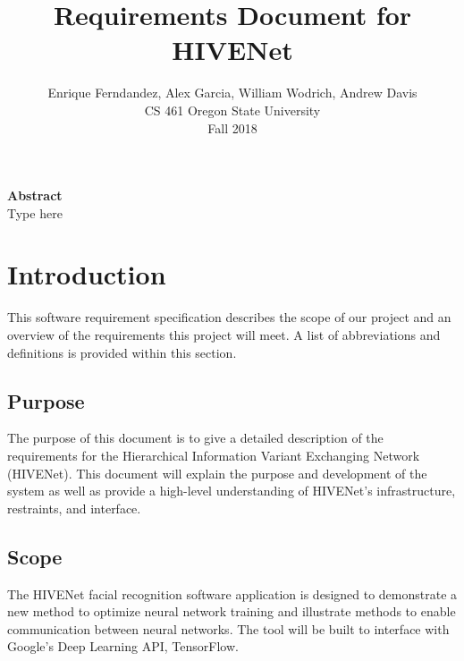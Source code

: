 \documentclass[onecolumn, draftclsnofoot,10pt, compsoc]{IEEEtran}
\title{Requirements Document for HIVENet}
\author{Enrique Ferndandez, Alex Garcia, William Wodrich, Andrew Davis\\CS 461 Oregon State University\\Fall 2018}
\begin{document}
\pagestyle{plain}

\begin{titlepage}
	\maketitle

	\pagestyle{plain}

	\noindent
	\textbf{Abstract} \\
	\indent
Type here

\end{titlepage}

\newpage
\tableofcontents
\newpage

\section{Introduction}
This software requirement specification describes the scope of our project and an overview of the requirements this project will meet.
A list of abbreviations and definitions is provided within this section.

	\subsection{Purpose}
The purpose of this document is to give a detailed description of the requirements for the Hierarchical Information Variant Exchanging Network (HIVENet).
This document will explain the purpose and development of the system as well as provide a high-level understanding of HIVENet's infrastructure, restraints, and interface.

	\subsection{Scope}
The HIVENet facial recognition software application is designed to demonstrate a new method to optimize neural network training and illustrate methods to enable communication between neural networks.
The tool will be built to interface with Google's Deep Learning API, TensorFlow\texttrademark .
\end{document}
